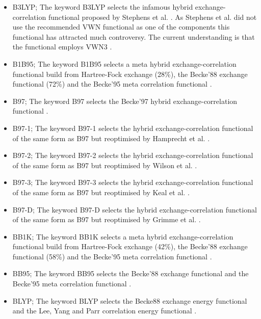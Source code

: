 \documentclass[11pt,fleqn]{article}
\begin{document}
\begin{itemize}
\item B3LYP;
The keyword B3LYP selects the infamous hybrid exchange-correlation functional
proposed by Stephens et al. \cite{stephens94}. As Stephens et al. did not use the
recommended VWN functional as one of the components this functional has 
attracted much controversy. The current understanding is that the functional 
employs VWN3 \cite{hertwig97}.

\item B1B95;
The keyword B1B95 selects a meta hybrid exchange-correlation functional build
from Hartree-Fock exchange (28\%), the Becke'88 exchange functional (72\%) and
the Becke'95 meta correlation functional \cite{becke96}.

\item B97;
The keyword B97 selects the Becke'97 hybrid exchange-correlation functional
\cite{becke97}.

\item B97-1;
The keyword B97-1 selects the hybrid exchange-correlation functional of the same
form as B97 but reoptimised by Hamprecht et al. \cite{hamprecht98,becke97}.

\item B97-2;
The keyword B97-2 selects the hybrid exchange-correlation functional of the same
form as B97 but reoptimised by Wilson et al. \cite{wilson01,becke97}.

\item B97-3;
The keyword B97-3 selects the hybrid exchange-correlation functional of the same
form as B97 but reoptimised by Keal et al. \cite{keal05,becke97}.

\item B97-D;
The keyword B97-D selects the hybrid exchange-correlation functional of the same
form as B97 but reoptimised by Grimme et al. \cite{grimme06,becke97}.

\item BB1K;
The keyword BB1K selects a meta hybrid exchange-correlation functional build from
Hartree-Fock exchange (42\%), the Becke'88 exchange functional (58\%) and the
Becke'95 meta correlation functional \cite{zhao04}.

\item BB95;
The keyword BB95 selects the Becke'88 exchange functional and the Becke'95
meta correlation functional \cite{becke96}.

\item BLYP;
The keyword BLYP selects the Becke88 exchange energy functional
\cite{becke88} and the Lee, Yang and Parr correlation energy functional
\cite{lyp}.


\end{itemize}
\end{document}
